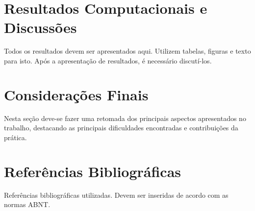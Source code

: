 \documentclass[12pt,a4paper]{article}
\begin{document}
\section{Resultados Computacionais e Discussões}

Todos os resultados devem ser apresentados aqui. Utilizem tabelas, figuras e texto para isto. Após a apresentação de resultados, é necessário discutí-los. 

\section{Considerações Finais}

Nesta seção deve-se fazer uma retomada dos principais aspectos apresentados no trabalho, destacando as principais dificuldades encontradas e contribuições da prática. 

\section{Referências Bibliográficas}

Referências bibliográficas utilizadas. Devem ser inseridas de acordo com as normas ABNT.


 
\label{lastpage}
\end{document}

